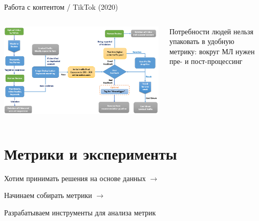\documentclass[11pt,aspectratio=169]{beamer}
\begin{document}
\begin{frame}{Работа с контентом / TikTok (2020) \cite{TIK}}
\begin{columns}
\begin{column}{0.6\textwidth}
   \begin{center}
		\includegraphics[scale=0.24]{images/tiktok.png}
   \end{center}
\end{column}
\begin{column}{0.3\textwidth}
    \begin{tcolorbox}[colback=info!5,colframe=info!80,title=]
    Потребности людей нельзя упаковать в удобную метрику: вокруг МЛ нужен пре- и пост-процессинг
    \end{tcolorbox}
\end{column}
\end{columns}

\end{frame}

\section{Метрики и эксперименты}

\begin{frame}{}

Хотим принимать решения на основе данных $\rightarrow$ 

\qquad Начинаем собирать метрики $\rightarrow$ 

\qquad \qquad Разрабатываем инструменты для анализа метрик

\end{frame}
\end{document}

